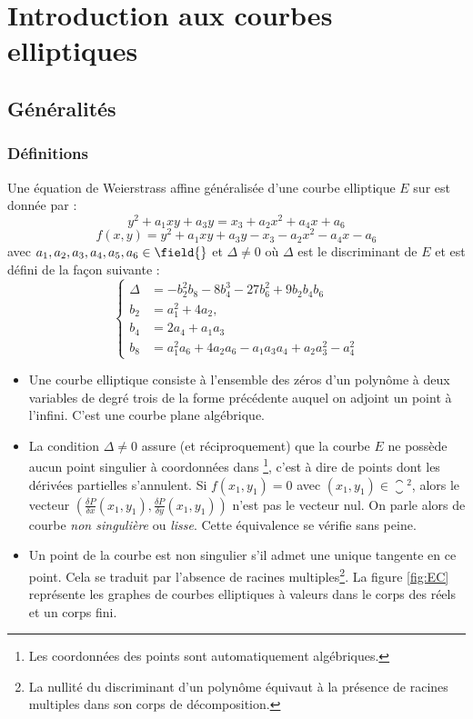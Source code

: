 \chapter{Introduction aux courbes elliptiques}
\section{Généralités}
\subsection{Définitions}
\begin{definition}
Une équation de Weierstrass affine généralisée d'une courbe elliptique $E$ sur \field{} est donnée par :
\begin{equation}
y^2 + a_1 xy + a_3 y = x_3 + a_2x^2 + a_4x + a_6
\end{equation}
\begin{equation}
f(x, y) = y^2 + a_1 xy + a_3 y - x_3 - a_2x^2 - a_4x - a_6
\end{equation}
avec $a_1, a_2, a_3, a_4, a_5, a_6  \in \field{}$ et $\Delta \neq 0$ où $\Delta$ est le discriminant de $E$ et est défini de la façon suivante : 
\begin{equation}
\begin{cases}
\Delta & = -b_2^2 b_8 - 8b_4^3 - 27b_6^2 + 9 b_2b_4b_6\\
b_2 &= a_1^2 + 4a_2,\\
b_4 &= 2a_4 + a_1a_3\\
b_8 &= a_1^2a_6 + 4a_2a_6 - a_1a_3a_4 + a_2a_3^2 - a_4^2
\end{cases}
\end{equation}
\end{definition}

\vspace{0.5cm}

\begin{itemize}[label=--]
    \item Une courbe elliptique consiste à l'ensemble des zéros d'un polynôme à deux variables de degré trois de la forme précédente auquel on adjoint un point à l'infini. C'est une courbe plane algébrique.
    \item La condition $\Delta \neq 0$ assure (et réciproquement) que la courbe $E$ ne possède aucun point singulier à coordonnées dans \closure{} \footnote{Les coordonnées des points sont automatiquement algébriques.}, c'est à dire de points dont les dérivées partielles s'annulent. Si $f(x_1, y_1) = 0$ avec $(x_1, y_1) \in \closure{}^2$, alors le vecteur $\left (\frac{\delta P}{\delta x}(x_1, y_1), \frac{\delta P}{\delta y}(x_1, y_1) \right )$ n'est pas le vecteur nul. On parle alors de courbe \emph{non singulière} ou \emph{lisse}. Cette équivalence se vérifie sans peine. 
    \item Un point de la courbe est non singulier s'il admet une unique tangente en ce point. Cela se traduit par l'absence de racines multiples\footnote{La nullité du discriminant d'un polynôme équivaut à la présence de racines multiples dans son corps de décomposition.}. La figure \ref{fig:EC} représente les graphes de courbes elliptiques à valeurs dans le corps des réels et un corps fini.
\end{itemize}

